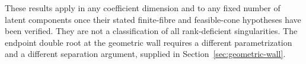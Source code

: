 These results apply in any coefficient dimension and to any fixed number
of latent components once their stated finite-fibre and feasible-cone
hypotheses have been verified. They are not a classification of all
rank-deficient singularities. The endpoint double root at the geometric
wall requires a different parametrization and a different separation
argument, supplied in Section~\ref{sec:geometric-wall}.
